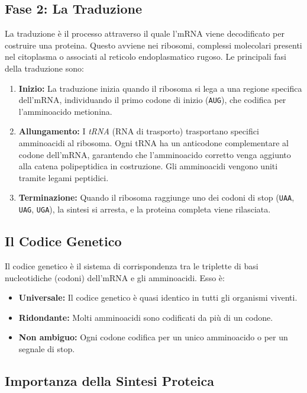 \documentclass[Lau,binding=0.6cm,oneside,noexaminfo]{sapthesis}
\begin{document}
\subsection{Fase 2: La Traduzione}

La traduzione è il processo attraverso il quale l'mRNA viene decodificato per costruire una proteina. Questo avviene nei ribosomi, complessi molecolari presenti nel citoplasma o associati al reticolo endoplasmatico rugoso. Le principali fasi della traduzione sono:
\begin{enumerate}
    \item \textbf{Inizio:} La traduzione inizia quando il ribosoma si lega a una regione specifica dell'mRNA, individuando il primo codone di inizio (\texttt{AUG}), che codifica per l'amminoacido metionina.
    \item \textbf{Allungamento:} I \textit{tRNA} (RNA di trasporto) trasportano specifici amminoacidi al ribosoma. Ogni tRNA ha un anticodone complementare al codone dell'mRNA, garantendo che l'amminoacido corretto venga aggiunto alla catena polipeptidica in costruzione. Gli amminoacidi vengono uniti tramite legami peptidici.
    \item \textbf{Terminazione:} Quando il ribosoma raggiunge uno dei codoni di stop (\texttt{UAA}, \texttt{UAG}, \texttt{UGA}), la sintesi si arresta, e la proteina completa viene rilasciata.
\end{enumerate}

\subsection{Il Codice Genetico}

Il codice genetico è il sistema di corrispondenza tra le triplette di basi nucleotidiche (codoni) dell'mRNA e gli amminoacidi. Esso è:
\begin{itemize}
    \item \textbf{Universale:} Il codice genetico è quasi identico in tutti gli organismi viventi.
    \item \textbf{Ridondante:} Molti amminoacidi sono codificati da più di un codone.
    \item \textbf{Non ambiguo:} Ogni codone codifica per un unico amminoacido o per un segnale di stop.
\end{itemize}

\subsection{Importanza della Sintesi Proteica}
\end{document}
